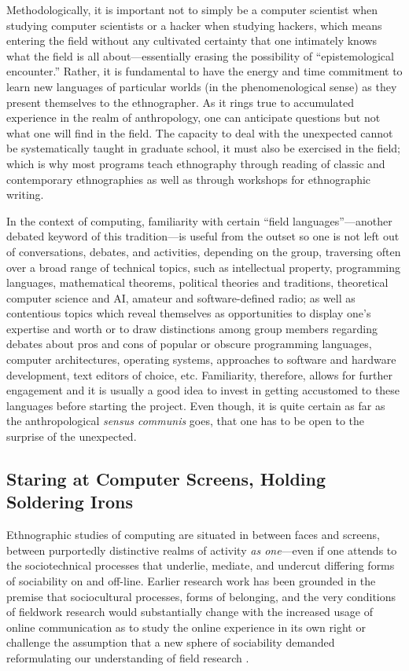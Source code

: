 \documentclass[10pt,letter,oneside]{scrartcl}
\begin{document}
Methodologically, it is important not to simply be a computer
scientist when studying computer scientists or a hacker when studying
hackers, which means entering the field without any cultivated
certainty that one intimately knows what the field is all
about---essentially erasing the possibility of ``epistemological
encounter.''  Rather, it is fundamental to have the energy and time
commitment to learn new languages of particular worlds (in the
phenomenological sense) as they present themselves to the
ethnographer.  As it rings true to accumulated experience in the realm
of anthropology, one can anticipate questions but not what one will
find in the field. The capacity to deal with the unexpected cannot be
systematically taught in graduate school, it must also be exercised in
the field; which is why most programs teach ethnography through
reading of classic and contemporary ethnographies as well as through
workshops for ethnographic writing.

In the context of computing, familiarity with certain ``field
languages''---another debated keyword of this tradition---is useful from the
outset so one is not left out of conversations, debates, and
activities, depending on the group, traversing often over a broad range 
of technical topics, such as intellectual property, programming languages, 
mathematical theorems, political theories and traditions, theoretical 
computer science and AI, amateur and software-defined radio; as well as
contentious topics which reveal themselves as opportunities to display
one's expertise and worth or to draw distinctions among group members
regarding debates about pros and cons of popular or obscure
programming languages, computer architectures, operating systems,
approaches to software and hardware development, text editors of
choice, etc. Familiarity, therefore, allows for further engagement and
it is usually a good idea to invest in getting accustomed to these
languages before starting the project. Even though, it is quite
certain as far as the anthropological \emph{sensus communis} goes,
that one has to be open to the surprise of the unexpected.



\subsection*{Staring at Computer Screens, Holding Soldering Irons}

Ethnographic studies of computing are situated in between faces and
screens, between purportedly distinctive realms of activity \emph{as
  one}---even if one attends to the sociotechnical processes that
underlie, mediate, and undercut differing forms of sociability on and
off-line. Earlier research work has been grounded in the premise that
sociocultural processes, forms of belonging, and the very conditions
of fieldwork research would substantially change with the increased
usage of online communication as to study the online experience in its
own right \cite{Turkle1984,Hine2000,Boelstorff2006} or challenge the
assumption that a new sphere of sociability demanded reformulating our
understanding of field research \cite{MillerandSlater2000,Malaby2008}.
\end{document}
